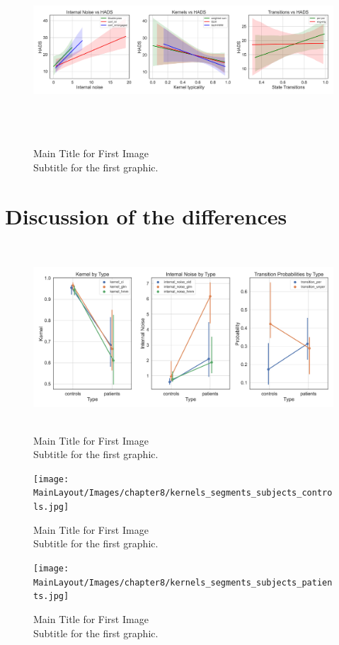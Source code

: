 \begin{figure}[H]
    \centering
    \includegraphics[width=17cm,height=7cm]{MainLayout/Images/chapter8/regression_results_hads.jpg}
    \caption{Main Title for First Image \\ \small Subtitle for the first graphic.}
    \label{fig:regression_results_hads}
\end{figure}
\section{Discussion of the differences} 
\begin{figure}[H]
    \centering
    \includegraphics[width=17cm,height=7cm]{MainLayout/Images/chapter8/revcor_measures.jpg}
    \caption{Main Title for First Image \\ \small Subtitle for the first graphic.}
    \label{fig:revcor_measures}
\end{figure}

\begin{figure}[H]
    \centering
    \texttt{[image: MainLayout/Images/chapter8/kernels\_segments\_subjects\_controls.jpg]}
    \caption{Main Title for First Image \\ \small Subtitle for the first graphic.}
    \label{fig:kernels_segments_subjects_controls}
\end{figure}

\begin{figure}[H]
    \centering
    \texttt{[image: MainLayout/Images/chapter8/kernels\_segments\_subjects\_patients.jpg]}
    \caption{Main Title for First Image \\ \small Subtitle for the first graphic.}
    \label{fig:kernels_segments_subjects_patients}
\end{figure}